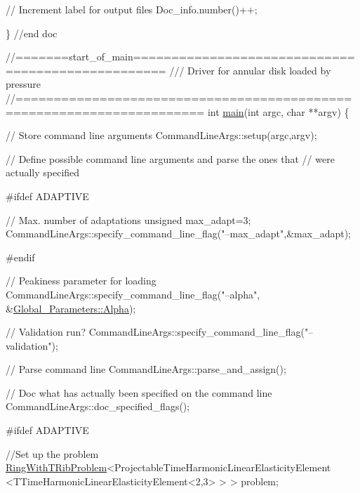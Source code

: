 \begin{DoxyCodeInclude}
{{{{ \textcolor{comment}{// Increment label for output files}
 Doc\_info.number()++;

\} \textcolor{comment}{//end doc}



\textcolor{comment}{//=======start\_of\_main==================================================}\textcolor{comment}{}
\textcolor{comment}{/// Driver for annular disk loaded by pressure}
\textcolor{comment}{}\textcolor{comment}{//======================================================================}
\textcolor{keywordtype}{int} \hyperlink{time__harmonic__elastic__annulus_8cc_a3c04138a5bfe5d72780bb7e82a18e627}{main}(\textcolor{keywordtype}{int} argc, \textcolor{keywordtype}{char} **argv)
\{

 \textcolor{comment}{// Store command line arguments}
 CommandLineArgs::setup(argc,argv);

 \textcolor{comment}{// Define possible command line arguments and parse the ones that}
 \textcolor{comment}{// were actually specified }
  
\textcolor{preprocessor}{#ifdef ADAPTIVE}

 \textcolor{comment}{// Max. number of adaptations}
 \textcolor{keywordtype}{unsigned} max\_adapt=3;
 CommandLineArgs::specify\_command\_line\_flag(\textcolor{stringliteral}{"--max\_adapt"},&max\_adapt);

\textcolor{preprocessor}{#endif}

 \textcolor{comment}{// Peakiness parameter for loading}
 CommandLineArgs::specify\_command\_line\_flag(\textcolor{stringliteral}{"--alpha"},
                                            &\hyperlink{namespaceGlobal__Parameters_afbe27ad463a1fb23cb99d029a9fac731}{Global\_Parameters::Alpha});

 \textcolor{comment}{// Validation run?}
 CommandLineArgs::specify\_command\_line\_flag(\textcolor{stringliteral}{"--validation"});

 \textcolor{comment}{// Parse command line}
 CommandLineArgs::parse\_and\_assign(); 
 
 \textcolor{comment}{// Doc what has actually been specified on the command line}
 CommandLineArgs::doc\_specified\_flags();

\textcolor{preprocessor}{#ifdef ADAPTIVE}

 \textcolor{comment}{//Set up the problem}
 \hyperlink{classRingWithTRibProblem}{RingWithTRibProblem}<ProjectableTimeHarmonicLinearElasticityElement
                    <TTimeHarmonicLinearElasticityElement<2,3> > >
  problem;

}}}}
\end{DoxyCodeInclude}
